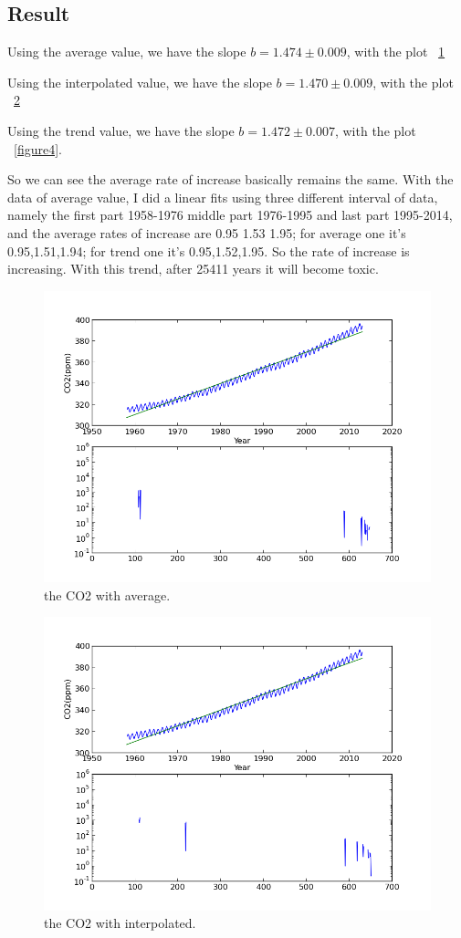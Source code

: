 \documentclass[11pt,letterpaper]{article}
\begin{document}
\subsection{Result}

Using the average value, we have the slope $b=1.474\pm0.009$, with the plot ~\ref{figure2} 

Using the interpolated value, we have the slope $b=1.470\pm0.009$, with the plot ~\ref{figure3} 

Using the trend value, we have the slope $b=1.472\pm0.007$, with the plot ~\ref{figure4}. 

So we can see the average rate of increase basically remains the same. 
With the data of average value, I did a linear fits using three different interval of data, namely the first part 1958-1976 middle part 1976-1995 and last part 1995-2014, and the average rates of increase are  0.95 1.53 1.95; for average one it's 0.95,1.51,1.94; for trend one it's 0.95,1.52,1.95. So the rate of increase is increasing. With this trend, after 25411 years it will become toxic. 


\begin{figure}
\begin{center}
\includegraphics[width=0.6\linewidth,angle=0]{q2ave.png}
\caption{the CO2 with average.}
\label{figure2}
\end{center}
\end{figure}


\begin{figure}
\begin{center}
\includegraphics[width=0.6\linewidth,angle=0]{q2inter.png}
\caption{the CO2 with interpolated.}
\label{figure3}
\end{center}
\end{figure}
\end{document}
